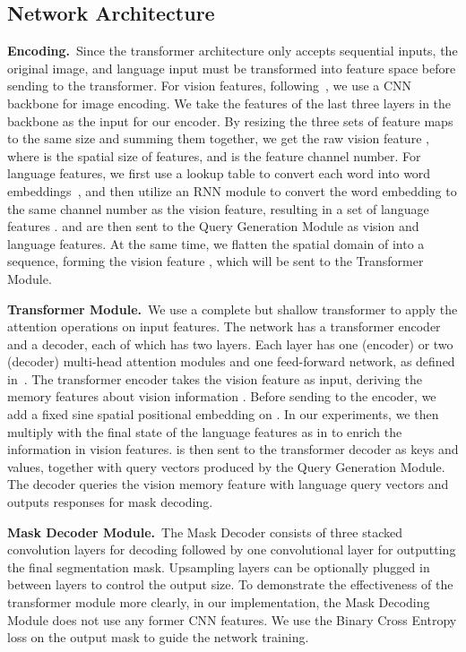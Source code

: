 \documentclass[10pt,twocolumn,letterpaper]{article}
\begin{document}
\subsection{Network Architecture}

\textbf{Encoding.}~Since the transformer architecture only accepts sequential inputs, the original image, and language input must be transformed into feature space before sending to the transformer. For vision features, following~\cite{carion2020end}, we use a CNN backbone for image encoding. We take the features of the last three layers in the backbone as the input for our encoder. By resizing the three sets of feature maps to the same size and summing them together, we get the raw vision feature , where  is the spatial size of features, and  is the feature channel number. For language features, we first use a lookup table to convert each word into word embeddings~\cite{zhanghui2021}, and then utilize an RNN module to convert the word embedding to the same channel number as the vision feature, resulting in a set of language features .  and  are then sent to the Query Generation Module as vision and language features. At the same time, we flatten the spatial domain of  into a sequence, forming the vision feature , which will be sent to the Transformer Module.

\textbf{Transformer Module.}~We use a complete but shallow transformer to apply the attention operations on input features. The network has a transformer encoder and a decoder, each of which has two layers. Each layer has one (encoder) or two (decoder) multi-head attention modules and one feed-forward network, as defined in~\cite{vaswani2017attention}. The transformer encoder takes the vision feature  as input, deriving the memory features about vision information . Before sending to the encoder, we add a fixed sine spatial positional embedding on . In our experiments, we then multiply  with the final state of the language features as in \cite{luo2020multi} to enrich the information in vision features.   is then sent to the transformer decoder as keys and values, together with  query vectors produced by the Query Generation Module. The decoder queries the vision memory feature with language query vectors and outputs  responses for mask decoding.

\textbf{Mask Decoder Module.}~The Mask Decoder consists of three stacked  convolution layers for decoding followed by one  convolutional layer for outputting the final segmentation mask. Upsampling layers can be optionally plugged in between layers to control the output size. To demonstrate the effectiveness of the transformer module more clearly, in our implementation, the Mask Decoding Module does not use any former CNN features. We use the Binary Cross Entropy loss on the output mask to guide the network training.
\end{document}
